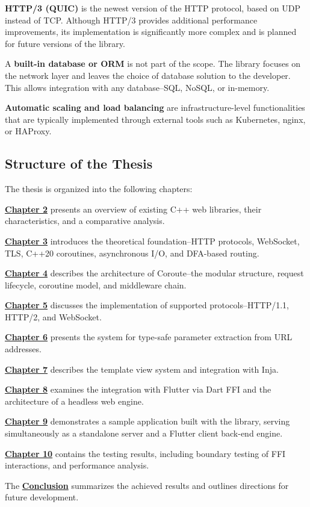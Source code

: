 \textbf{HTTP/3 (QUIC)} is the newest version of the HTTP protocol, based on UDP instead of TCP. Although HTTP/3 provides additional performance improvements, its implementation is significantly more complex and is planned for future versions of the library.

A \textbf{built-in database or ORM} is not part of the scope. The library focuses on the network layer and leaves the choice of database solution to the developer. This allows integration with any database--SQL, NoSQL, or in-memory.

\textbf{Automatic scaling and load balancing} are infrastructure-level functionalities that are typically implemented through external tools such as Kubernetes, nginx, or HAProxy.

\subsection{Structure of the Thesis}

The thesis is organized into the following chapters:

\textbf{\hyperref[sec:existing_solutions]{Chapter 2}} presents an overview of existing C++ web libraries, their characteristics, and a comparative analysis.

\textbf{\hyperref[sec:theoretical_background]{Chapter 3}} introduces the theoretical foundation--HTTP protocols, WebSocket, TLS, C++20 coroutines, asynchronous I/O, and DFA-based routing.

\textbf{\hyperref[sec:architecture]{Chapter 4}} describes the architecture of Coroute--the modular structure, request lifecycle, coroutine model, and middleware chain.

\textbf{\hyperref[sec:protocols]{Chapter 5}} discusses the implementation of supported protocols--HTTP/1.1, HTTP/2, and WebSocket.

\textbf{\hyperref[sec:type_safe_params]{Chapter 6}} presents the system for type-safe parameter extraction from URL addresses.

\textbf{\hyperref[sec:views_templating]{Chapter 7}} describes the template view system and integration with Inja.

\textbf{\hyperref[sec:flutter_integration]{Chapter 8}} examines the integration with Flutter via Dart FFI and the architecture of a headless web engine.

\textbf{\hyperref[sec:example_app]{Chapter 9}} demonstrates a sample application built with the library, serving simultaneously as a standalone server and a Flutter client back-end engine.

\textbf{\hyperref[sec:testing]{Chapter 10}} contains the testing results, including boundary testing of FFI interactions, and performance analysis.

The \textbf{\hyperref[sec:conclusion]{Conclusion}} summarizes the achieved results and outlines directions for future development.
